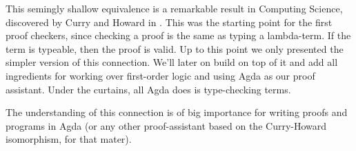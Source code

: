 This semingly shallow equivalence is a remarkable result in Computing Science, discovered
by Curry and Howard in \cite{Curry01,Howard01}. This was the starting point for the
first proof checkers, since checking a proof is the same as typing a lambda-term. If the
term is typeable, then the proof is valid. Up to this point we only presented the simpler
version of this connection. We'll later on build on top of it and add all ingredients
for working over first-order logic and using Agda as our proof assistant. Under the curtains,
all Agda does is type-checking terms.

The understanding of this connection is of big importance for writing proofs and programs in
Agda (or any other proof-assistant based on the Curry-Howard isomorphism, for that mater).



